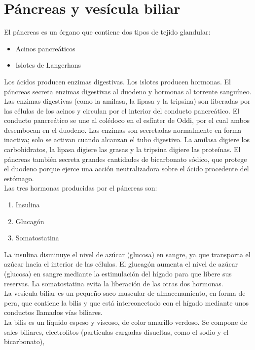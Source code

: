 \section{Páncreas y vesícula biliar}
El páncreas es un órgano que contiene dos tipos de tejido glandular:\\
\begin{itemize}
    \item Acinos pancreáticos
    \item Islotes de Langerhans    
\end{itemize}
Los ácidos producen enzimas digestivas. Los islotes producen hormonas. El páncreas secreta enzimas digestivas al duodeno y hormonas al torrente sanguíneo.\\
Las enzimas digestivas (como la amilasa, la lipasa y la tripsina) son liberadas por las células de los acinos y circulan por el interior del conducto pancreático. 
El conducto pancreático se une al colédoco en el esfínter de Oddi, por el cual ambos desembocan en el duodeno. Las enzimas son secretadas normalmente en forma inactiva; 
solo se activan cuando alcanzan el tubo digestivo. La amilasa digiere los carbohidratos, la lipasa digiere las grasas y la tripsina digiere las proteínas. El páncreas 
también secreta grandes cantidades de bicarbonato sódico, que protege el duodeno porque ejerce una acción neutralizadora sobre el ácido procedente del estómago.\\
Las tres hormonas producidas por el páncreas son:\\
\begin{enumerate}
    \item Insulina
    \item Glucagón
    \item Somatostatina    
\end{enumerate}
La insulina disminuye el nivel de azúcar (glucosa) en sangre, ya que transporta el azúcar hacia el interior de las células. El glucagón aumenta el nivel de azúcar (glucosa) 
en sangre mediante la estimulación del hígado para que libere sus reservas. La somatostatina evita la liberación de las otras dos hormonas.\\
La vesícula biliar es un pequeño saco muscular de almacenamiento, en forma de pera, que contiene la bilis y que está interconectado con el hígado mediante unos conductos 
llamados vías biliares.\\
La bilis es un líquido espeso y viscoso, de color amarillo verdoso. Se compone de sales biliares, electrolitos (partículas cargadas disueltas, como el sodio y el bicarbonato), 
